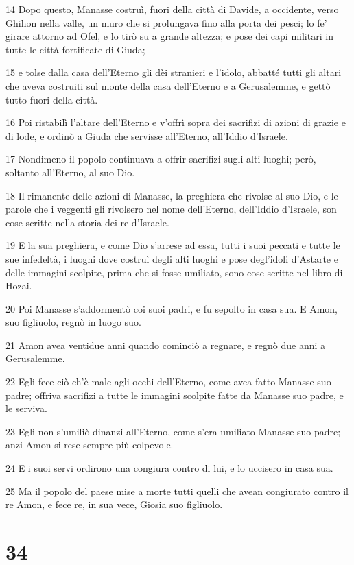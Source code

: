 \par 14 Dopo questo, Manasse costruì, fuori della città di Davide, a occidente, verso Ghihon nella valle, un muro che si prolungava fino alla porta dei pesci; lo fe' girare attorno ad Ofel, e lo tirò su a grande altezza; e pose dei capi militari in tutte le città fortificate di Giuda;
\par 15 e tolse dalla casa dell'Eterno gli dèi stranieri e l'idolo, abbatté tutti gli altari che aveva costruiti sul monte della casa dell'Eterno e a Gerusalemme, e gettò tutto fuori della città.
\par 16 Poi ristabilì l'altare dell'Eterno e v'offrì sopra dei sacrifizi di azioni di grazie e di lode, e ordinò a Giuda che servisse all'Eterno, all'Iddio d'Israele.
\par 17 Nondimeno il popolo continuava a offrir sacrifizi sugli alti luoghi; però, soltanto all'Eterno, al suo Dio.
\par 18 Il rimanente delle azioni di Manasse, la preghiera che rivolse al suo Dio, e le parole che i veggenti gli rivolsero nel nome dell'Eterno, dell'Iddio d'Israele, son cose scritte nella storia dei re d'Israele.
\par 19 E la sua preghiera, e come Dio s'arrese ad essa, tutti i suoi peccati e tutte le sue infedeltà, i luoghi dove costruì degli alti luoghi e pose degl'idoli d'Astarte e delle immagini scolpite, prima che si fosse umiliato, sono cose scritte nel libro di Hozai.
\par 20 Poi Manasse s'addormentò coi suoi padri, e fu sepolto in casa sua. E Amon, suo figliuolo, regnò in luogo suo.
\par 21 Amon avea ventidue anni quando cominciò a regnare, e regnò due anni a Gerusalemme.
\par 22 Egli fece ciò ch'è male agli occhi dell'Eterno, come avea fatto Manasse suo padre; offriva sacrifizi a tutte le immagini scolpite fatte da Manasse suo padre, e le serviva.
\par 23 Egli non s'umiliò dinanzi all'Eterno, come s'era umiliato Manasse suo padre; anzi Amon si rese sempre più colpevole.
\par 24 E i suoi servi ordirono una congiura contro di lui, e lo uccisero in casa sua.
\par 25 Ma il popolo del paese mise a morte tutti quelli che avean congiurato contro il re Amon, e fece re, in sua vece, Giosia suo figliuolo.

\chapter{34}

